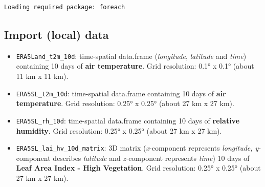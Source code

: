 \documentclass[
  letterpaper,
  DIV=11,
  numbers=noendperiod]{scrartcl}
\begin{document}
\begin{verbatim}
Loading required package: foreach
\end{verbatim}

\subsection{Import (local) data}\label{import-local-data}

\begin{itemize}
\item
  \texttt{ERA5Land\_t2m\_10d}: time-spatial data.frame
  (\emph{longitude}, \emph{latitude} and \emph{time}) containing 10 days
  of \textbf{air temperature}. Grid resolution: 0.1° x 0.1° (about 11 km
  x 11 km).
\item
  \texttt{ERA5SL\_t2m\_10d}: time-spatial data.frame containing 10 days
  of \textbf{air temperature}. Grid resolution: 0.25° x 0.25° (about 27
  km x 27 km).
\item
  \texttt{ERA5SL\_rh\_10d}: time-spatial data.frame containing 10 days
  of \textbf{relative humidity}. Grid resolution: 0.25° x 0.25° (about
  27 km x 27 km).
\item
  \texttt{ERA5SL\_lai\_hv\_10d\_matrix}: 3D matrix (\emph{x}-component
  represents \emph{longitude, y}-component describes \emph{latitude} and
  \emph{z-}component represents \emph{time}) 10 days of \textbf{Leaf
  Area Index - High Vegetation}. Grid resolution: 0.25° x 0.25° (about
  27 km x 27 km).
\end{itemize}
\end{document}
